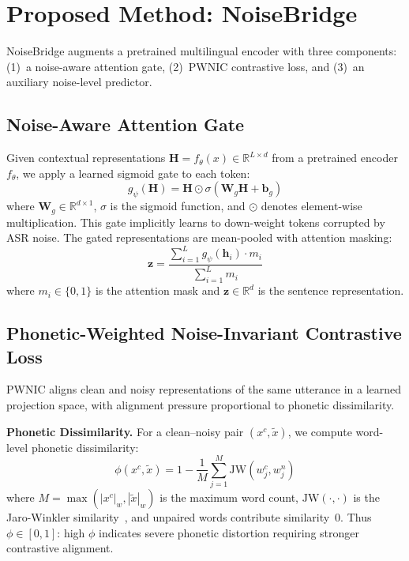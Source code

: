 \documentclass[conference]{IEEEtran}
\begin{document}
\section{Proposed Method: NoiseBridge}
\label{sec:method}

NoiseBridge augments a pretrained multilingual encoder with three components: (1)~a noise-aware attention gate, (2)~PWNIC contrastive loss, and (3)~an auxiliary noise-level predictor.

\subsection{Noise-Aware Attention Gate}

Given contextual representations $\mathbf{H} = f_\theta(x) \in \mathbb{R}^{L \times d}$ from a pretrained encoder $f_\theta$, we apply a learned sigmoid gate to each token:
\begin{equation}
    g_\psi(\mathbf{H}) = \mathbf{H} \odot \sigma(\mathbf{W}_g \mathbf{H} + \mathbf{b}_g)
    \label{eq:gate}
\end{equation}
where $\mathbf{W}_g \in \mathbb{R}^{d \times 1}$, $\sigma$ is the sigmoid function, and $\odot$ denotes element-wise multiplication. This gate implicitly learns to down-weight tokens corrupted by ASR noise. The gated representations are mean-pooled with attention masking:
\begin{equation}
    \mathbf{z} = \frac{\sum_{i=1}^{L} g_\psi(\mathbf{h}_i) \cdot m_i}{\sum_{i=1}^{L} m_i}
    \label{eq:pool}
\end{equation}
where $m_i \in \{0, 1\}$ is the attention mask and $\mathbf{z} \in \mathbb{R}^d$ is the sentence representation.

\subsection{Phonetic-Weighted Noise-Invariant Contrastive Loss}
\label{sec:pwnic}

PWNIC aligns clean and noisy representations of the same utterance in a learned projection space, with alignment pressure proportional to phonetic dissimilarity.

\textbf{Phonetic Dissimilarity.} For a clean--noisy pair $(x^c, \tilde{x})$, we compute word-level phonetic dissimilarity:
\begin{equation}
    \phi(x^c, \tilde{x}) = 1 - \frac{1}{M} \sum_{j=1}^{M} \text{JW}(w_j^c, w_j^n)
    \label{eq:phi}
\end{equation}
where $M = \max(|x^c|_w, |\tilde{x}|_w)$ is the maximum word count, $\text{JW}(\cdot, \cdot)$ is the Jaro-Winkler similarity~\cite{winkler1990string}, and unpaired words contribute similarity~0. Thus $\phi \in [0, 1]$: high $\phi$ indicates severe phonetic distortion requiring stronger contrastive alignment.
\end{document}
